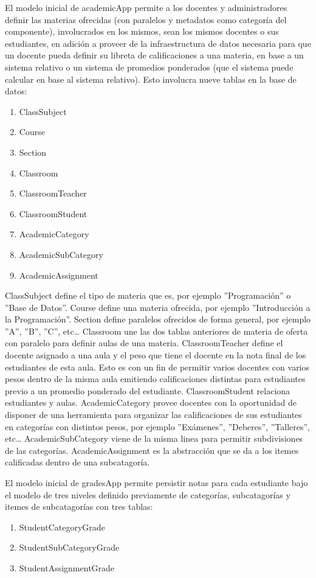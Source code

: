 El modelo inicial de academicApp permite a los docentes y administradores definir las materias ofrecidas (con paralelos y metadatos como categoría del componente), involucrados en los mismos, sean los mismos docentes o sus estudiantes, en adición a proveer de la infraestructura de datos necesaria para que un docente pueda definir su libreta de calificaciones a una materia, en base a un sistema relativo o un sistema de promedios ponderados (que el sistema puede calcular en base al sistema relativo). Esto involucra nueve tablas en la base de datos:
\begin{enumerate}
  \item ClassSubject
  \item Course
  \item Section
  \item Classroom
  \item ClassroomTeacher
  \item ClassroomStudent
  \item AcademicCategory
  \item AcademicSubCategory
  \item AcademicAssignment
\end{enumerate}
ClassSubject define el tipo de materia que es, por ejemplo ''Programación'' o ''Base de Datos''. Course define una materia ofrecida, por ejemplo ''Introducción a la Programación''. Section define paralelos ofrecidos de forma general, por ejemplo ''A'', ''B'', ''C'', etc\ldots{} Classroom une las dos tablas anteriores de materia de oferta con paralelo para definir aulas de una materia. ClassroomTeacher define el docente asignado a una aula y el peso que tiene el docente en la nota final de los estudiantes de esta aula. Esto es con un fin de permitir varios docentes con varios pesos dentro de la misma aula emitiendo calificaciones distintas para estudiantes previo a un promedio ponderado del estudiante. ClassroomStudent relaciona estudiantes y aulas. AcademicCategory provee docentes con la oportunidad de disponer de una herramienta para organizar las calificaciones de sus estudiantes en categorías con distintos pesos, por ejemplo ''Exámenes'', ''Deberes'', ''Talleres'', etc\ldots{} AcademicSubCategory viene de la misma linea para permitir subdivisiones de las categorías. AcademicAssignment es la abstracción que se da a los itemes calificadas dentro de una subcatagoría.

El modelo inicial de gradesApp permite persistir notas para cada estudiante bajo el modelo de tres niveles definido previamente de categorías, subcatagorías y itemes de subcatagorías con tres tablas:
\begin{enumerate}
  \item StudentCategoryGrade
  \item StudentSubCategoryGrade
  \item StudentAssignmentGrade
\end{enumerate}


